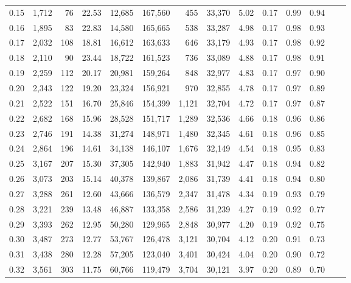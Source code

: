 \begin{tabular}{rrrrrrrrrrrrrr}
0.15 &  1,712 &   76 &   22.53 &   12,685 &  167,560 &     455 &  33,370 &  5.02 &  0.17 &  0.99 &      0.94 \\
0.16 &  1,895 &   83 &   22.83 &   14,580 &  165,665 &     538 &  33,287 &  4.98 &  0.17 &  0.98 &      0.93 \\
0.17 &  2,032 &  108 &   18.81 &   16,612 &  163,633 &     646 &  33,179 &  4.93 &  0.17 &  0.98 &      0.92 \\
0.18 &  2,110 &   90 &   23.44 &   18,722 &  161,523 &     736 &  33,089 &  4.88 &  0.17 &  0.98 &      0.91 \\
0.19 &  2,259 &  112 &   20.17 &   20,981 &  159,264 &     848 &  32,977 &  4.83 &  0.17 &  0.97 &      0.90 \\
0.20 &  2,343 &  122 &   19.20 &   23,324 &  156,921 &     970 &  32,855 &  4.78 &  0.17 &  0.97 &      0.89 \\
0.21 &  2,522 &  151 &   16.70 &   25,846 &  154,399 &   1,121 &  32,704 &  4.72 &  0.17 &  0.97 &      0.87 \\
0.22 &  2,682 &  168 &   15.96 &   28,528 &  151,717 &   1,289 &  32,536 &  4.66 &  0.18 &  0.96 &      0.86 \\
0.23 &  2,746 &  191 &   14.38 &   31,274 &  148,971 &   1,480 &  32,345 &  4.61 &  0.18 &  0.96 &      0.85 \\
0.24 &  2,864 &  196 &   14.61 &   34,138 &  146,107 &   1,676 &  32,149 &  4.54 &  0.18 &  0.95 &      0.83 \\
0.25 &  3,167 &  207 &   15.30 &   37,305 &  142,940 &   1,883 &  31,942 &  4.47 &  0.18 &  0.94 &      0.82 \\
0.26 &  3,073 &  203 &   15.14 &   40,378 &  139,867 &   2,086 &  31,739 &  4.41 &  0.18 &  0.94 &      0.80 \\
0.27 &  3,288 &  261 &   12.60 &   43,666 &  136,579 &   2,347 &  31,478 &  4.34 &  0.19 &  0.93 &      0.79 \\
0.28 &  3,221 &  239 &   13.48 &   46,887 &  133,358 &   2,586 &  31,239 &  4.27 &  0.19 &  0.92 &      0.77 \\
0.29 &  3,393 &  262 &   12.95 &   50,280 &  129,965 &   2,848 &  30,977 &  4.20 &  0.19 &  0.92 &      0.75 \\
0.30 &  3,487 &  273 &   12.77 &   53,767 &  126,478 &   3,121 &  30,704 &  4.12 &  0.20 &  0.91 &      0.73 \\
0.31 &  3,438 &  280 &   12.28 &   57,205 &  123,040 &   3,401 &  30,424 &  4.04 &  0.20 &  0.90 &      0.72 \\
0.32 &  3,561 &  303 &   11.75 &   60,766 &  119,479 &   3,704 &  30,121 &  3.97 &  0.20 &  0.89 &      0.70 \\

\end{tabular}
